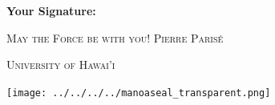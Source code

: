 \documentclass[addpoints, 12pt]{exam}%
\theoremstyle{definition}
\begin{document}
\vspace{1cm}

\noindent\textbf{Your Signature:} \hrulefill

\vspace*{1.5cm}
\noindent \textsc{May the Force be with you!} \hfill \textsc{Pierre Parisé}

\vspace*{0.5cm}

\begin{center}
\begin{minipage}{0.29\textwidth}
\begin{Huge}
\textsc{University of Hawai'i}
\end{Huge}
\end{minipage}
\begin{minipage}{0.12\textwidth}
\texttt{[image: ../../../../manoaseal\_transparent.png]}
\end{minipage}
\end{center}


\vspace*{0.5cm}

\newpage %


	
\end{document}
